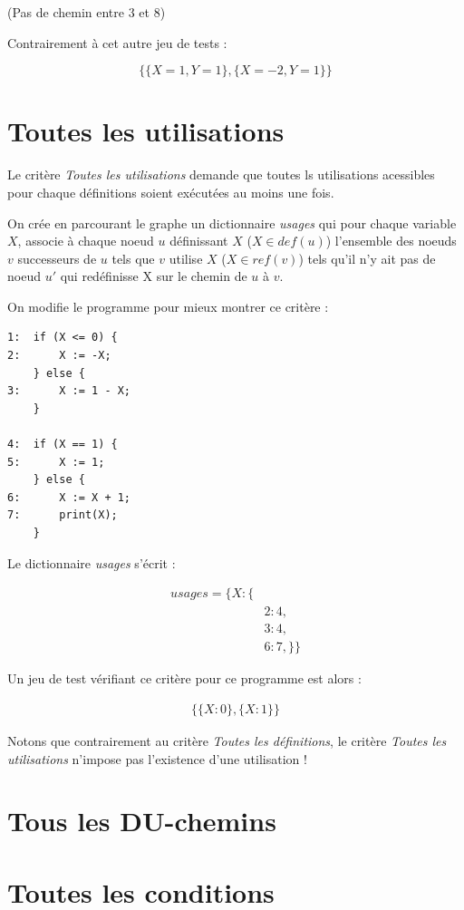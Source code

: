 \documentclass[a4paper, 12pt]{report}
\begin{document}
(Pas de chemin entre 3 et 8)


Contrairement à cet autre jeu de tests :

\[ \{
	\{ X=1, Y=1\},
	\{ X=-2, Y=1 \}
\} \]

\section{Toutes les utilisations}

Le critère \textit{Toutes les utilisations} demande que toutes ls utilisations acessibles pour chaque définitions soient exécutées au moins une fois.

On crée en parcourant le graphe un dictionnaire \textit{usages} qui pour chaque variable $X$, associe à chaque noeud $u$ définissant $X$ ($X \in def(u)$) l'ensemble des noeuds $v$ successeurs de $u$ tels que $v$ utilise $X$ ($X \in ref(v)$) tels qu'il n'y ait pas de noeud $u'$ qui redéfinisse X sur le chemin de $u$ à $v$.

On modifie le programme pour mieux montrer ce critère :
\begin{verbatim}
1:  if (X <= 0) {
2:      X := -X;
    } else {
3:      X := 1 - X;
    }

4:  if (X == 1) {
5:      X := 1;
    } else {
6:      X := X + 1;
7: 		print(X);
    }
\end{verbatim}

Le dictionnaire \textit{usages} s'écrit :

\begin{align*}
usages = \{
			X : \{ &\\
		&2 : 4, \\
		&3 : 4, \\
		&6 : 7,	\}\}
\end{align*}

Un jeu de test vérifiant ce critère pour ce programme est alors :

\begin{align*}
\{
	\{ X : 0 \},
	\{ X : 1 \}
\}
\end{align*}

Notons que contrairement au critère \textit{Toutes les définitions}, le critère \textit{Toutes les utilisations} n'impose pas l'existence d'une utilisation !

\section{Tous les DU-chemins}
\section{Toutes les conditions}
\end{document}
